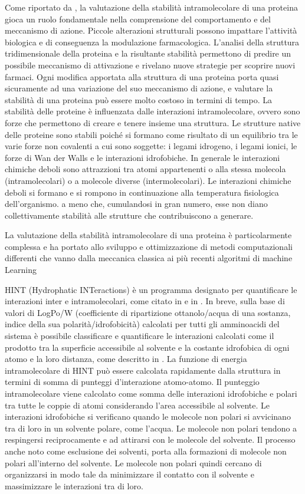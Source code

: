 Come riportato da \cite{AgostaCozzini}, la valutazione della stabilità intramolecolare di una proteina gioca un ruolo fondamentale nella comprensione del comportamento e del meccanismo di azione. Piccole alterazioni strutturali possono impattare l'attività biologica e di conseguenza la modulazione farmacologica. 
L'analisi della struttura tridimensionale della proteina e la risultante stabilità permettono di predire un possibile meccanismo di attivazione e rivelano nuove strategie per scoprire nuovi farmaci. Ogni modifica apportata alla struttura di una proteina porta quasi sicuramente ad una variazione del suo meccanismo di azione, e valutare la stabilità di una proteina può essere molto costoso in termini di tempo.
La stabilità delle proteine è influenzata dalle interazioni intramolecolare, ovvero sono forze che permettono di creare e tenere insieme una struttura. Le strutture native delle proteine sono stabili poiché si formano come risultato di un equilibrio tra le varie forze non covalenti a cui sono soggette: i legami idrogeno, i legami ionici, le forze di Wan der Walls e le interazioni idrofobiche. In generale le interazioni chimiche deboli sono attrazzioni tra atomi appartenenti o alla stessa molecola (intramolecolari) o a molecole diverse (intermolecolari). Le interazioni chimiche deboli si formano e si rompono in continuazione alla temperatura fisiologica dell'organismo. a meno che, cumulandosi in gran numero, esse non diano collettivamente stabilità alle strutture che contribuiscono a generare.

La valutazione della stabilità intramolecolare di una proteina è particolarmente complessa e ha portato allo sviluppo e ottimizzazione di metodi computazionali differenti che vanno dalla meccanica classica ai più recenti algoritmi di machine Learning

HINT (Hydrophatic INTeractions) è un programma designato per quantificare le interazioni inter e intramolecolari, come citato in \cite{Kellogg1991} e in \cite{EUGENEKELLOGG2000651}.
In breve, sulla base di valori di LogPo/W (coefficiente di ripartizione ottanolo/acqua di una sostanza, indice della sua polarità/idrofobicità) calcolati per tutti gli amminoacidi del sistema è possibile classificare e quantificare le interazioni calcolati come il prodotto tra la superficie accessibile al solvente e la costante idrofobica di ogni atomo e la loro distanza, come descritto in \cite{ExtensionFragment}. La funzione di energia intramolecolare di HINT può essere calcolata rapidamente dalla struttura in termini di somma di punteggi d'interazione atomo-atomo. Il punteggio intramolecolare viene calcolato come somma delle interazioni idrofobiche e polari tra tutte le coppie di atomi considerando l'area accessibile al solvente. Le interazioni idrofobiche si verificano quando le molecole non polari si avvicinano tra di loro in un solvente polare, come l'acqua. Le molecole non polari tendono a respingersi reciprocamente e ad attirarsi con le molecole del solvente. Il processo anche noto come esclusione dei solventi, porta alla formazioni di molecole non polari all'interno del solvente. Le molecole non polari quindi cercano di organizzarsi in modo tale da minimizzare il contatto con il solvente e massimizzare le interazioni tra di loro. 

